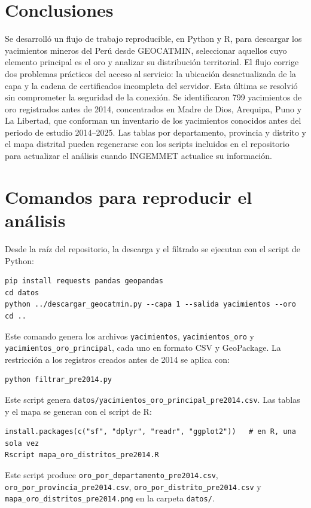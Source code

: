 \documentclass[man,12pt,a4paper,floatsintext,donotrepeattitle]{apa7}
\begin{document}
\section{Conclusiones}

Se desarrolló un flujo de trabajo reproducible, en Python y R, para descargar los
yacimientos mineros del Perú desde GEOCATMIN, seleccionar aquellos cuyo
elemento principal es el oro y analizar su distribución territorial. El flujo
corrige dos problemas prácticos del acceso al servicio: la ubicación desactualizada
de la capa y la cadena de certificados incompleta del servidor. Esta última se
resolvió sin comprometer la seguridad de la conexión. Se identificaron 799
yacimientos de oro registrados antes de 2014, concentrados en Madre de Dios,
Arequipa, Puno y La Libertad, que conforman un inventario de los yacimientos
conocidos antes del periodo de estudio 2014--2025.
Las tablas por departamento, provincia y distrito y el mapa distrital pueden
regenerarse con los scripts incluidos en el repositorio para actualizar el
análisis cuando INGEMMET actualice su información.

\printbibliography

\appendix

\section{Comandos para reproducir el análisis}

Desde la raíz del repositorio, la descarga y el filtrado se ejecutan con el
script de Python:

\begin{lstlisting}
pip install requests pandas geopandas
cd datos
python ../descargar_geocatmin.py --capa 1 --salida yacimientos --oro
cd ..
\end{lstlisting}

Este comando genera los archivos \texttt{yacimientos}, \texttt{yacimientos\_oro}
y \texttt{yacimientos\_oro\_principal}, cada uno en formato CSV y GeoPackage.
La restricción a los registros creados antes de 2014 se aplica con:

\begin{lstlisting}
python filtrar_pre2014.py
\end{lstlisting}

Este script genera \texttt{datos/yacimientos\_oro\_principal\_pre2014.csv}. Las
tablas y el mapa se generan con el script de R:

\begin{lstlisting}
install.packages(c("sf", "dplyr", "readr", "ggplot2"))   # en R, una sola vez
Rscript mapa_oro_distritos_pre2014.R
\end{lstlisting}

Este script produce \texttt{oro\_por\_departamento\_pre2014.csv},
\texttt{oro\_por\_provincia\_pre2014.csv},
\texttt{oro\_por\_distrito\_pre2014.csv} y
\texttt{mapa\_oro\_distritos\_pre2014.png} en la carpeta \texttt{datos/}.
\end{document}
